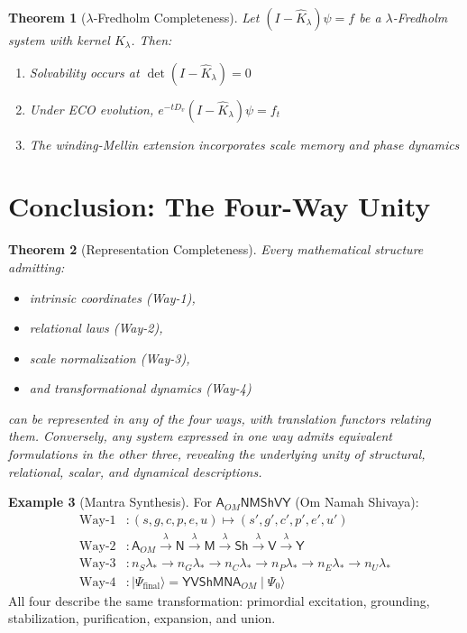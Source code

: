 \documentclass[12pt, reqno]{amsart}
\theoremstyle{plain}
\newtheorem{theorem}{Theorem}[section]
\theoremstyle{definition}
\newtheorem{example}[theorem]{Example}
\theoremstyle{remark}
\newcommand{\lstar}{\lambda_{*}}
\newcommand{\fred}{\widehat{K}}
\newcommand{\OM}{\mathsf{A}_{OM}}
\newcommand{\NA}{\mathsf{N}}
\newcommand{\MA}{\mathsf{M}}
\newcommand{\SHI}{\mathsf{Sh}}
\newcommand{\VA}{\mathsf{V}}
\newcommand{\YA}{\mathsf{Y}}
\begin{document}
\begin{theorem}[$\lambda$-Fredholm Completeness]
Let $(I - \fred_{\lambda})\psi = f$ be a $\lambda$-Fredholm system with kernel $K_{\lambda}$.
Then:
\begin{enumerate}
    \item Solvability occurs at $\det(I - \fred_{\lambda}) = 0$
    \item Under ECO evolution, $e^{-tD_v}(I - \fred_{\lambda})\psi = f_t$
    \item The winding-Mellin extension incorporates scale memory and phase dynamics
\end{enumerate}
\end{theorem}

\section{Conclusion: The Four-Way Unity}

\begin{theorem}[Representation Completeness]
Every mathematical structure admitting:
\begin{itemize}
    \item intrinsic coordinates (Way-1),
    \item relational laws (Way-2),
    \item scale normalization (Way-3),
    \item and transformational dynamics (Way-4)
\end{itemize}
can be represented in any of the four ways, with translation functors relating them. Conversely,
any system expressed in one way admits equivalent formulations in the other three, revealing the
underlying unity of structural, relational, scalar, and dynamical descriptions.
\end{theorem}

\begin{center}
\end{center}

\begin{example}[Mantra Synthesis]
For $\OM \NA \MA \SHI \VA \YA$ (Om Namah Shivaya):
\begin{align*}
\text{Way-1} &: (s,g,c,p,e,u) \mapsto (s',g',c',p',e',u') \\
\text{Way-2} &: \OM \xrightarrow{\lambda} \NA \xrightarrow{\lambda} \MA \xrightarrow{\lambda} \SHI \xrightarrow{\lambda} \VA \xrightarrow{\lambda} \YA \\
\text{Way-3} &: n_S\lstar \to n_G\lstar \to n_C\lstar \to n_P\lstar \to n_E\lstar \to n_U\lstar \\
\text{Way-4} &: \mid \Psi_{\text{final}}\rangle = \YA \VA \SHI \MA \NA \OM \mid \Psi_0\rangle
\end{align*}
All four describe the same transformation: primordial excitation, grounding, stabilization,
purification, expansion, and union.
\end{example}
\end{document}
